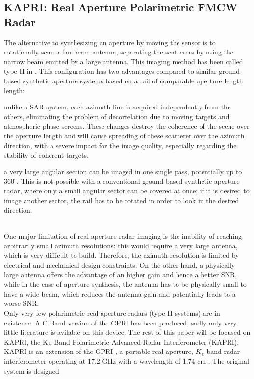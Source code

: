 \subsection{KAPRI: Real Aperture Polarimetric FMCW Radar}
The alternative to synthesizing an aperture by moving the sensor is to rotationally scan a fan beam antenna, separating the scatterers by using the  narrow beam emitted by a large antenna\cite{Werner2008}. This imaging method has been called type II in \cite{Caduff2015}. 
This configuration has two advantages compared to similar ground-based synthetic aperture systems based on a rail\cite{Monserrat2014} of comparable aperture length length: \begin{enumerate*}
  \item unlike a SAR system, each azimuth line is 
acquired independently from the others, eliminating the problem of decorrelation due to moving targets and atmospheric phase screens. 
These changes destroy the coherence of the scene over the aperture length and will cause spreading of these scatterer over
the azimuth direction, with a severe impact for the image quality, especially regarding the stability of coherent targets. \item a very large 
angular section can be imaged in one single pass, potentially up to $360^{\circ}$. This is not possible with a conventional ground based synthetic aperture radar, where only a small angular sector
can be covered at once; if it is desired to image another sector, the rail has to be rotated in order to look in the desired direction. \
\end{enumerate*}\\
One major limitation of real aperture radar imaging is the inability of reaching arbitrarily small azimuth resolutions: this would require a very large antenna, which is very difficult to build.
Therefore, the azimuth resolution is limited by electrical and mechanical design constraints. On the other hand, a physically large antenna offers the advantage of an higher gain and hence a better SNR, while in the case
of aperture synthesis, the antenna has to be physically small to have a wide beam, which reduces the antenna gain and potentially leads to a worse SNR.\\
Only very few polarimetric real aperture radars (type II systems) are in existence. A C-Band version of the GPRI has been produced\cite{Cherukumilli2012}, sadly only very little literature is avilable on this device. The rest of this paper will be focused on KAPRI, the Ku-Band Polarimetric Advanced Radar Interferometer (KAPRI). KAPRI is an extension of the GPRI \cite{werner_gpri_2012,Strozzi2011, Werner2008}, a portable real-aperture, $K_u$ band radar interferometer operating at 17.2 GHz with a wavelength of 1.74 cm . The original system is designed 
